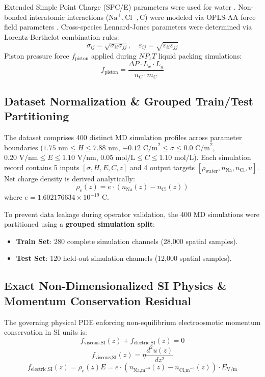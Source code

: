 \documentclass[3p,preprint,12pt,numbers,square,sort&compress]{elsarticle}
\begin{document}
Extended Simple Point Charge (SPC/E) parameters were used for water \cite{arya2026}. Non-bonded interatomic interactions ($\text{Na}^+, \text{Cl}^-, \text{C}$) were modeled via OPLS-AA force field parameters \cite{arya2022}. Cross-species Lennard-Jones parameters were determined via Lorentz-Berthelot combination rules:
\begin{equation}
    \sigma_{ij} = \sqrt{\sigma_{ii} \sigma_{jj}}, \quad \varepsilon_{ij} = \sqrt{\varepsilon_{ii} \varepsilon_{jj}}
\end{equation}
Piston pressure force $f_{\text{piston}}$ applied during $NP_zT$ liquid packing simulations:
\begin{equation}
    f_{\text{piston}} = \frac{\Delta P \cdot L_x \cdot L_y}{n_C \cdot m_C}
\end{equation}

\subsection{Dataset Normalization \& Grouped Train/Test Partitioning}
The dataset comprises 400 distinct MD simulation profiles across parameter boundaries ($1.75\text{ nm} \le H \le 7.88\text{ nm}$, $-0.12\text{ C/m}^2 \le \sigma \le 0.0\text{ C/m}^2$, $0.20\text{ V/nm} \le E \le 1.10\text{ V/nm}$, $0.05\text{ mol/L} \le C \le 1.10\text{ mol/L}$). Each simulation record contains 5 inputs $[\sigma, H, E, C, z]$ and 4 output targets $[\rho_{\text{water}}, n_{\text{Na}}, n_{\text{Cl}}, u]$. Net charge density is derived analytically:
\begin{equation}
    \rho_e(z) = e \cdot \left( n_{\text{Na}}(z) - n_{\text{Cl}}(z) \right)
\end{equation}
where $e = 1.602176634 \times 10^{-19}\text{ C}$.

To prevent data leakage during operator validation, the 400 MD simulations were partitioned using a \textbf{grouped simulation split}:
\begin{itemize}
    \item \textbf{Train Set}: 280 complete simulation channels (28,000 spatial samples).
    \item \textbf{Test Set}: 120 held-out simulation channels (12,000 spatial samples).
\end{itemize}

\subsection{Exact Non-Dimensionalized SI Physics \& Momentum Conservation Residual}
The governing physical PDE enforcing non-equilibrium electroosmotic momentum conservation in SI units is:
\begin{equation}
    f_{\text{viscous,SI}}(z) + f_{\text{electric,SI}}(z) = 0
\end{equation}
\begin{equation}
    f_{\text{viscous,SI}}(z) = \eta \frac{d^2 u(z)}{d z^2}
\end{equation}
\begin{equation}
    f_{\text{electric,SI}}(z) = \rho_e(z) E = e \cdot \left( n_{\text{Na,m}^{-3}}(z) - n_{\text{Cl,m}^{-3}}(z) \right) \cdot E_{\text{V/m}}
\end{equation}
\end{document}
